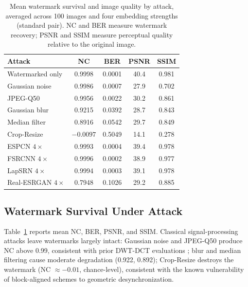 \documentclass[conference]{IEEEtran}
\begin{document}
\begin{table}[t]
\caption{Mean watermark survival and image quality by attack, averaged
across 100 images and four embedding strengths (standard pair). NC and
BER measure watermark recovery; PSNR and SSIM measure perceptual
quality relative to the original image.}
\label{tab:survival}
\centering
\begin{tabular}{lcccc}
\toprule
Attack & NC & BER & PSNR & SSIM \\
\midrule
Watermarked only       & 0.9998  & 0.0001 & 40.4 & 0.981 \\
Gaussian noise         & 0.9986  & 0.0007 & 27.9 & 0.702 \\
JPEG-Q50               & 0.9956  & 0.0022 & 30.2 & 0.861 \\
Gaussian blur          & 0.9215  & 0.0392 & 28.7 & 0.843 \\
Median filter          & 0.8916  & 0.0542 & 29.7 & 0.849 \\
Crop-Resize            & $-0.0097$ & 0.5049 & 14.1 & 0.278 \\
ESPCN $4\times$        & 0.9993  & 0.0004 & 39.4 & 0.978 \\
FSRCNN $4\times$       & 0.9996  & 0.0002 & 38.9 & 0.977 \\
LapSRN $4\times$       & 0.9994  & 0.0003 & 39.1 & 0.978 \\
Real-ESRGAN $4\times$  & 0.7948  & 0.1026 & 29.2 & 0.885 \\
\bottomrule
\end{tabular}
\end{table}

\subsection{Watermark Survival Under Attack}
Table~\ref{tab:survival} reports mean NC, BER, PSNR, and SSIM.
Classical signal-processing attacks leave watermarks largely intact:
Gaussian noise and JPEG-Q50 produce NC above 0.99, consistent with prior
DWT-DCT evaluations \cite{alhaj2007}; blur and median filtering cause
moderate degradation (0.922, 0.892); Crop-Resize destroys the watermark
(NC $\approx -0.01$, chance-level), consistent with the known
vulnerability of block-aligned schemes to geometric desynchronization.
\end{document}
